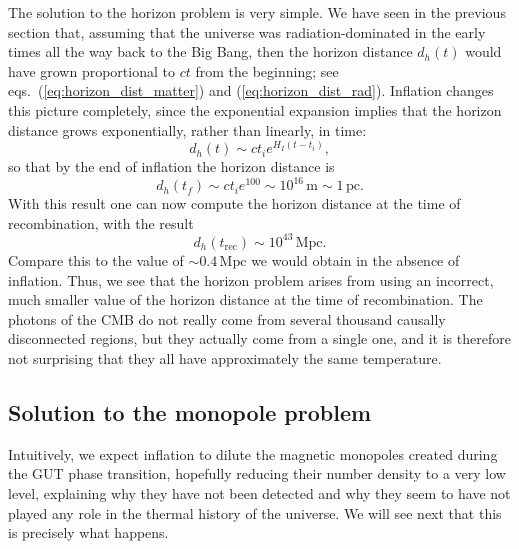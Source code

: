The solution to the horizon problem is very simple. We have seen in the previous section that, assuming that the universe was radiation-dominated in the early times all the way back to the Big Bang, then the horizon distance $d_h(t)$ would have grown proportional to $ct$ from the beginning; see eqs.\ (\ref{eq:horizon_dist_matter}) and (\ref{eq:horizon_dist_rad}). Inflation changes this picture completely, since the exponential expansion implies that the horizon distance grows exponentially, rather than linearly, in time:
\begin{equation}
d_h(t)\sim ct_i e^{H_I(t-t_i)},
\end{equation}
so that by the end of inflation the horizon distance is
\begin{equation}
d_h(t_f)\sim ct_i e^{100}\sim 10^{16}\,{\mathrm{m}}\sim 1\,{\mathrm{pc}}.
\end{equation}
With this result one can now compute the horizon distance at the time of recombination, with the result
\begin{equation}
d_h(t_{\mathrm{rec}})\sim 10^{43}\,{\mathrm{Mpc}}.
\end{equation}
Compare this to the value of $\sim 0.4\,\mathrm{Mpc}$ we would obtain in the absence of inflation. Thus, we see that the horizon problem arises from using an incorrect, much smaller value of the horizon distance at the time of recombination. The photons of the CMB do not really come from several thousand causally disconnected regions, but they actually come from a single one, and it is therefore not surprising that they all have approximately the same temperature.

\subsection{Solution to the monopole problem}

Intuitively, we expect inflation to dilute the magnetic monopoles created during the GUT phase transition, hopefully reducing their number density to a very low level, explaining why they have not been detected and why they seem to have not played any role in the thermal history of the universe. We will see next that this is precisely what happens.

